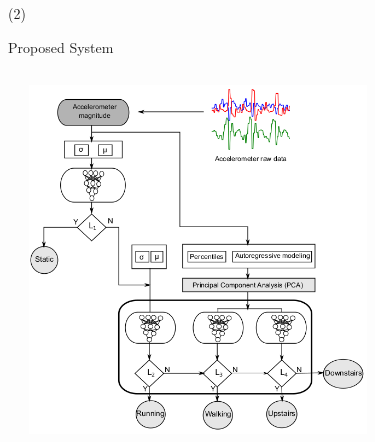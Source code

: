 \begin{frame}{ (2)}
\begin{block}{Proposed System}
\begin{columns}
\begin{column}{0.49\textwidth}
\end{column}
\begin{column}{0.49\textwidth}
\begin{center}
\includegraphics[width=0.7\textwidth]{Figs/DeteccionActividad5}
          \end{center}
\end{column}

\end{columns}
\end{block}
\end{frame}


